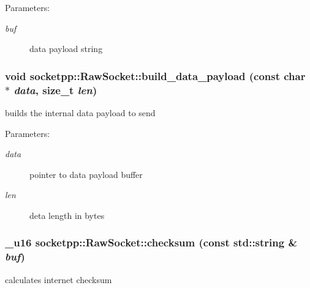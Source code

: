\begin{Desc}
\item[Parameters:]
\begin{description}
\item[{\em buf}]data payload string \end{description}
\end{Desc}
\hypertarget{classsocketpp_1_1RawSocket_99ea2415525269d24ba088a58d62abdd}{
\subsubsection[{build\_\-data\_\-payload}]{\setlength{\rightskip}{0pt plus 5cm}void socketpp::RawSocket::build\_\-data\_\-payload (const char $\ast$ {\em data}, \/  size\_\-t {\em len})}}
\label{classsocketpp_1_1RawSocket_99ea2415525269d24ba088a58d62abdd}


builds the internal data payload to send 

\begin{Desc}
\item[Parameters:]
\begin{description}
\item[{\em data}]pointer to data payload buffer \item[{\em len}]deta length in bytes \end{description}
\end{Desc}
\hypertarget{classsocketpp_1_1RawSocket_67af2c9f3bc37146b54fc9fb69c0dd8d}{
\subsubsection[{checksum}]{\setlength{\rightskip}{0pt plus 5cm}\_\-u16 socketpp::RawSocket::checksum (const std::string \& {\em buf})}}
\label{classsocketpp_1_1RawSocket_67af2c9f3bc37146b54fc9fb69c0dd8d}


calculates internet checksum 

